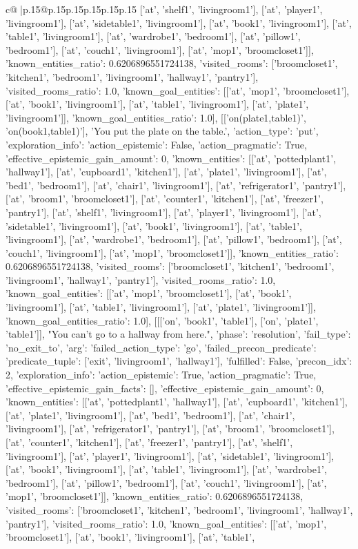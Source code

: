 \documentclass{article}
\begin{document}
{\begin{supertabular}{c@{$\;$}|p{.15\linewidth}@{}p{.15\linewidth}p{.15\linewidth}p{.15\linewidth}p{.15\linewidth}p{.15\linewidth}}
{{{['at', 'shelf1', 'livingroom1'], ['at', 'player1', 'livingroom1'], ['at', 'sidetable1', 'livingroom1'], ['at', 'book1', 'livingroom1'], ['at', 'table1', 'livingroom1'], ['at', 'wardrobe1', 'bedroom1'], ['at', 'pillow1', 'bedroom1'], ['at', 'couch1', 'livingroom1'], ['at', 'mop1', 'broomcloset1']], 'known_entities_ratio': 0.6206896551724138, 'visited_rooms': ['broomcloset1', 'kitchen1', 'bedroom1', 'livingroom1', 'hallway1', 'pantry1'], 'visited_rooms_ratio': 1.0, 'known_goal_entities': [['at', 'mop1', 'broomcloset1'], ['at', 'book1', 'livingroom1'], ['at', 'table1', 'livingroom1'], ['at', 'plate1', 'livingroom1']], 'known_goal_entities_ratio': 1.0}}], [['on(plate1,table1)', 'on(book1,table1)'], 'You put the plate on the table.', {'action_type': 'put', 'exploration_info': {'action_epistemic': False, 'action_pragmatic': True, 'effective_epistemic_gain_amount': 0, 'known_entities': [['at', 'pottedplant1', 'hallway1'], ['at', 'cupboard1', 'kitchen1'], ['at', 'plate1', 'livingroom1'], ['at', 'bed1', 'bedroom1'], ['at', 'chair1', 'livingroom1'], ['at', 'refrigerator1', 'pantry1'], ['at', 'broom1', 'broomcloset1'], ['at', 'counter1', 'kitchen1'], ['at', 'freezer1', 'pantry1'], ['at', 'shelf1', 'livingroom1'], ['at', 'player1', 'livingroom1'], ['at', 'sidetable1', 'livingroom1'], ['at', 'book1', 'livingroom1'], ['at', 'table1', 'livingroom1'], ['at', 'wardrobe1', 'bedroom1'], ['at', 'pillow1', 'bedroom1'], ['at', 'couch1', 'livingroom1'], ['at', 'mop1', 'broomcloset1']], 'known_entities_ratio': 0.6206896551724138, 'visited_rooms': ['broomcloset1', 'kitchen1', 'bedroom1', 'livingroom1', 'hallway1', 'pantry1'], 'visited_rooms_ratio': 1.0, 'known_goal_entities': [['at', 'mop1', 'broomcloset1'], ['at', 'book1', 'livingroom1'], ['at', 'table1', 'livingroom1'], ['at', 'plate1', 'livingroom1']], 'known_goal_entities_ratio': 1.0}}], [[['on', 'book1', 'table1'], ['on', 'plate1', 'table1']], "You can't go to a hallway from here.", {'phase': 'resolution', 'fail_type': 'no_exit_to', 'arg': {'failed_action_type': 'go', 'failed_precon_predicate': {'predicate_tuple': ['exit', 'livingroom1', 'hallway1'], 'fulfilled': False, 'precon_idx': 2}}, 'exploration_info': {'action_epistemic': True, 'action_pragmatic': True, 'effective_epistemic_gain_facts': [], 'effective_epistemic_gain_amount': 0, 'known_entities': [['at', 'pottedplant1', 'hallway1'], ['at', 'cupboard1', 'kitchen1'], ['at', 'plate1', 'livingroom1'], ['at', 'bed1', 'bedroom1'], ['at', 'chair1', 'livingroom1'], ['at', 'refrigerator1', 'pantry1'], ['at', 'broom1', 'broomcloset1'], ['at', 'counter1', 'kitchen1'], ['at', 'freezer1', 'pantry1'], ['at', 'shelf1', 'livingroom1'], ['at', 'player1', 'livingroom1'], ['at', 'sidetable1', 'livingroom1'], ['at', 'book1', 'livingroom1'], ['at', 'table1', 'livingroom1'], ['at', 'wardrobe1', 'bedroom1'], ['at', 'pillow1', 'bedroom1'], ['at', 'couch1', 'livingroom1'], ['at', 'mop1', 'broomcloset1']], 'known_entities_ratio': 0.6206896551724138, 'visited_rooms': ['broomcloset1', 'kitchen1', 'bedroom1', 'livingroom1', 'hallway1', 'pantry1'], 'visited_rooms_ratio': 1.0, 'known_goal_entities': [['at', 'mop1', 'broomcloset1'], ['at', 'book1', 'livingroom1'], ['at', 'table1', }}}
\end{supertabular}}
\end{document}
